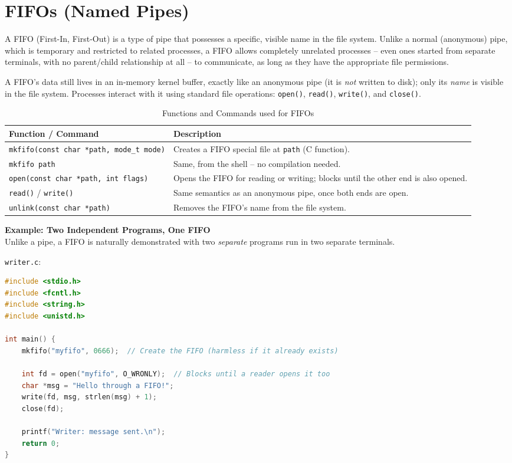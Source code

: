 \section{FIFOs (Named Pipes)}
A FIFO (First-In, First-Out) is a type of pipe that possesses a specific, visible name in the file system. Unlike a normal (anonymous) pipe, which is temporary and restricted to related processes, a FIFO allows completely unrelated processes -- even ones started from separate terminals, with no parent/child relationship at all -- to communicate, as long as they have the appropriate file permissions.

A FIFO's data still lives in an in-memory kernel buffer, exactly like an anonymous pipe (it is \emph{not} written to disk); only its \emph{name} is visible in the file system. Processes interact with it using standard file operations: \texttt{open()}, \texttt{read()}, \texttt{write()}, and \texttt{close()}.

\begin{table}[h!]
\centering
\small
\renewcommand{\arraystretch}{1.3}
\begin{tabular}{|p{5.5cm}|p{8.5cm}|}
\hline
\textbf{Function / Command} & \textbf{Description} \\ \hline
\texttt{mkfifo(const char *path, mode\_t mode)} & Creates a FIFO special file at \texttt{path} (C function). \\ \hline
\texttt{mkfifo path} & Same, from the shell -- no compilation needed. \\ \hline
\texttt{open(const char *path, int flags)} & Opens the FIFO for reading or writing; blocks until the other end is also opened. \\ \hline
\texttt{read()} / \texttt{write()} & Same semantics as an anonymous pipe, once both ends are open. \\ \hline
\texttt{unlink(const char *path)} & Removes the FIFO's name from the file system. \\ \hline
\end{tabular}
\caption{Functions and Commands used for FIFOs}
\end{table}

\textbf{Example: Two Independent Programs, One FIFO}\\
Unlike a pipe, a FIFO is naturally demonstrated with two \emph{separate} programs run in two separate terminals.

\texttt{writer.c}:
\begin{lstlisting}[language=C]
#include <stdio.h>
#include <fcntl.h>
#include <string.h>
#include <unistd.h>

int main() {
    mkfifo("myfifo", 0666);  // Create the FIFO (harmless if it already exists)

    int fd = open("myfifo", O_WRONLY);  // Blocks until a reader opens it too
    char *msg = "Hello through a FIFO!";
    write(fd, msg, strlen(msg) + 1);
    close(fd);

    printf("Writer: message sent.\n");
    return 0;
}
\end{lstlisting}

